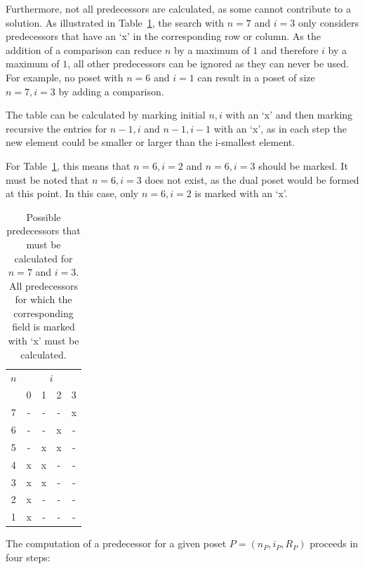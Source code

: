 \documentclass[10pt,journal,compsoc]{IEEEtran}
\begin{document}
Furthermore, not all predecessors are calculated, as some cannot contribute to a solution.
As illustrated in Table~\ref{table:n_i_values_calculated}, the search with $n = 7$ and $i = 3$ only considers predecessors that have an `x' in the corresponding row or column. As the addition of a comparison can reduce $n$ by a maximum of $1$ and therefore $i$ by a maximum of $1$, all other predecessors can be ignored as they can never be used.
For example, no poset with $n = 6$ and $i = 1$ can result in a poset of size $n = 7, i = 3$ by adding a comparison.

The table can be calculated by marking initial $n, i$ with an `x' and then marking recursive the entries for $n - 1, i$ and $n - 1, i - 1$ with an `x', as in each step the new element could be smaller or larger than the i-smallest element.

For Table~\ref{table:n_i_values_calculated}, this means that $n = 6, i = 2$ and $n = 6, i = 3$ should be marked.
It must be noted that $n = 6, i = 3$ does not exist, as the dual poset would be formed at this point.
In this case, only $n = 6, i = 2$ is marked with an `x'.

\begin{table}[!t]
  \renewcommand{\arraystretch}{1.2}
  \caption{Possible predecessors that must be calculated for $n = 7$ and $i = 3$. All predecessors for which the corresponding field is marked with `x' must be calculated.}
  \label{table:n_i_values_calculated}
  \centering
  \begin{tabular}{c|cccc}
    $n$ & \multicolumn{4}{c}{$i$}             \\
        & 0                       & 1 & 2 & 3 \\ \hline
    7   & -                       & - & - & x \\
    6   & -                       & - & x & - \\
    5   & -                       & x & x & - \\
    4   & x                       & x & - & - \\
    3   & x                       & x & - & - \\
    2   & x                       & - & - & - \\
    1   & x                       & - & - & - \\
  \end{tabular}%
\end{table}

The computation of a predecessor for a given poset $P = (n_P, i_P, R_P)$ proceeds in four steps:
\end{document}
